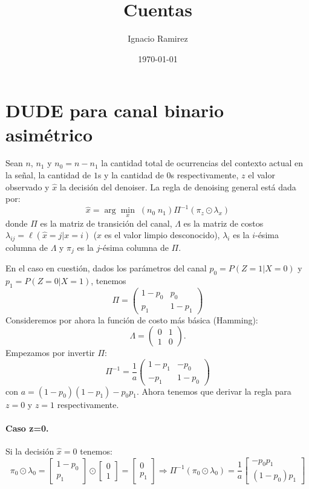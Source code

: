 \documentclass{article}
\title{Cuentas}
\author{Ignacio Ramirez}
\date{\today}
\begin{document}
\maketitle
\def\t{^{T}}
\def\inv{^{-1}}
\def\hx{\hat{x}}

\section{DUDE para canal binario asimétrico}

Sean $n$, $n_1$ y $n_0=n-n_1$ la cantidad total de ocurrencias del contexto actual en la señal, la cantidad de $1$s y la cantidad de $0$s respectivamente,  $z$ el valor observado y $\hx$ la decisión del denoiser.  La regla de denoising general está dada por:
$$\hx = \arg\min_x\; (n_0\;n_1)\Pi\inv(\pi_z \odot \lambda_x)$$
donde $\Pi$ es la matriz de transición del canal, $\Lambda$ es la matriz de costos $\lambda_{ij}=\ell(\hx=j|x=i)$ ($x$ es el valor limpio desconocido), $\lambda_i$ es la $i$-ésima columna de $\Lambda$ y $\pi_j$ es la $j$-ésima columna de $\Pi$.

En el caso en cuestión, dados los parámetros del canal $p_0=P(Z=1|X=0)$ y $p_1=P(Z=0|X=1)$, tenemos
\[
\Pi=\left(
\begin{array}{cc}
1-p_0 & p_0 \\
p_1   & 1-p_1 
\end{array}
\right)
\]
Consideremos por ahora la función de costo más básica (Hamming):
\[
\Lambda=\left(
\begin{array}{cc}
0 & 1 \\
1   & 0 
\end{array}
\right).
\]
Empezamos por invertir $\Pi$:
\[
\Pi\inv=\frac{1}{a}\left(
\begin{array}{cc}
1-p_1 & -p_0 \\
-p_1   & 1-p_0 
\end{array}
\right)
\]
con $a=(1-p_0)(1-p_1)-p_0p_1$. Ahora tenemos que derivar la regla para $z=0$ y $z=1$ respectivamente.
\paragraph{Caso z=0.} Si la decisión $\hx=0$ tenemos: 
\[
\pi_0 \odot \lambda_0=\left[
\begin{array}{c}
1-p_0 \\
p_1   
\end{array}
\right] \odot
\left[
\begin{array}{c}
0 \\
1   
\end{array}
\right] = \left[
\begin{array}{c}
0 \\
p_1   
\end{array}
\right] 
\Rightarrow 
\Pi\inv(\pi_0 \odot \lambda_0) = \frac{1}{a}
\left[
\begin{array}{c}
-p_0p_1 \\
(1-p_0)p_1 
\end{array}
\right]
\]
\end{document}
